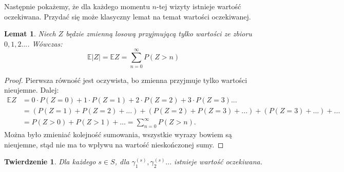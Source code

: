 \documentclass[a4paper]{article}
\theoremstyle{defn}
\theoremstyle{theorem}
\newtheorem{theorem}[defn]{Twierdzenie}
\theoremstyle{lemma}
\newtheorem{lemma}[defn]{Lemat}
\theoremstyle{cor}
\theoremstyle{fact}
\begin{document}
Następnie pokażemy, że dla każdego momentu $n$-tej wizyty istnieje wartość oczekiwana. Przydać się może klasyczny lemat na temat wartości oczekiwanej.
\begin{lemma}\label{lemma2.5.4}
Niech $Z$ będzie zmienną losową przyjmującą tylko wartości ze zbioru $0,1,2...$. Wówczas:
$$\mathbb{E}|Z| = \mathbb{E}Z = \sum\limits_{n = 0}^{\infty} P(Z > n)$$
\end{lemma}
\begin{proof}
Pierwsza równość jest oczywista, bo zmienna przyjmuje tylko wartości nieujemne. Dalej:
\begin{align*}
    \mathbb{E}Z &= 0 \cdot P(Z = 0) + 1 \cdot P(Z = 1) + 2 \cdot P(Z = 2) + 3 \cdot P(Z = 3)... \\
    &= (P(Z = 1) + P(Z = 2) + ...) + (P(Z = 2) + P(Z = 3) + ...) + (P(Z = 3) + ...) + ...\\
    &= P(Z > 0) + P(Z > 1) + ... = \sum\limits_{n = 0}^{\infty} P(Z > n).
\end{align*}
Można było zmieniać kolejność sumowania, wszystkie wyrazy bowiem są nieujemne, stąd nie ma to wpływu na wartość nieskończonej sumy.
\end{proof}
\begin{theorem}\label{theorem2.5.5}
Dla każdego $s\in S$, dla $\gamma_1^{(s)}, \gamma_2^{(s)}...$ istnieje wartość oczekiwana.
\end{theorem}
\end{document}
